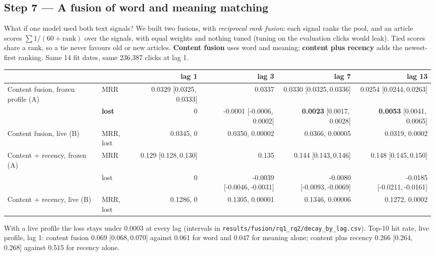 \documentclass[11pt,a4paper]{article}
\newcommand{\ci}[2]{[#1,\,#2]}
\begin{document}
\subsection{Step 7 --- A fusion of word and meaning matching}
What if one model used both text signals? We built two fusions, with \emph{reciprocal rank fusion}: each signal ranks the pool, and an article scores $\sum 1/(60+\text{rank})$ over the signals, with equal weights and nothing tuned (tuning on the evaluation clicks would leak). Tied scores share a rank, so a tie never favours old or new articles. \textbf{Content fusion} uses word and meaning; \textbf{content plus recency} adds the newest-first ranking. Same 14 fit dates, same 236,387 clicks at lag 1.
\begin{center}\scriptsize
\setlength{\tabcolsep}{3pt}
\begin{tabular}{@{}llrrrr@{}}
\toprule
 & & lag 1 & lag 3 & lag 7 & lag 13\\
\midrule
Content fusion, frozen profile (A) & MRR & 0.0329 \ci{0.0325}{0.0333} & 0.0337 & 0.0330 \ci{0.0325}{0.0336} & 0.0254 \ci{0.0244}{0.0263}\\
\rowcolor{green!12} & \textbf{lost} & 0 & -0.0001 \ci{-0.0006}{0.0002} & \textbf{0.0023} \ci{0.0017}{0.0028} & \textbf{0.0053} \ci{0.0041}{0.0065}\\
Content fusion, live (B) & MRR, lost & 0.0345, 0 & 0.0350, 0.00002 & 0.0366, 0.00005 & 0.0319, 0.0002\\
Content + recency, frozen (A) & MRR & 0.129 \ci{0.128}{0.130} & 0.135 & 0.144 \ci{0.143}{0.146} & 0.148 \ci{0.145}{0.150}\\
 & lost & 0 & -0.0039 \ci{-0.0046}{-0.0031} & -0.0080 \ci{-0.0093}{-0.0069} & -0.0185 \ci{-0.0211}{-0.0161}\\
Content + recency, live (B) & MRR, lost & 0.1286, 0 & 0.1305, 0.00001 & 0.1346, 0.00006 & 0.1272, 0.0002\\
\bottomrule
\end{tabular}
\end{center}
With a live profile the loss stays under 0.0003 at every lag (intervals in \texttt{results/fusion/rq1\_rq2/decay\_by\_lag.csv}). Top-10 hit rate, live profile, lag 1: content fusion 0.069 \ci{0.068}{0.070} against 0.061 for word and 0.047 for meaning alone; content plus recency 0.266 \ci{0.264}{0.268} against 0.515 for recency alone.
\end{document}
